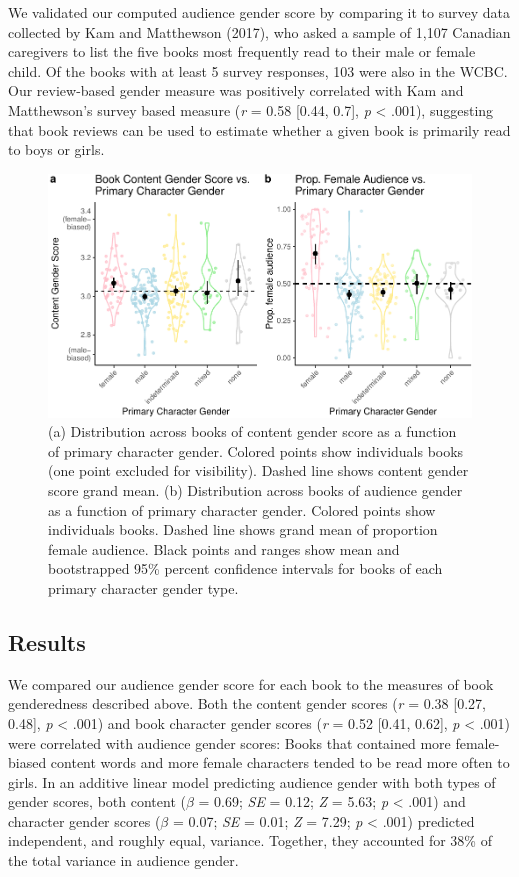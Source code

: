 \documentclass[english,,man,floatsintext]{apa6}
\begin{document}
We validated our computed audience gender score by comparing it to survey data collected by Kam and Matthewson (2017), who asked a sample of 1,107 Canadian caregivers to list the five books most frequently read to their male or female child. Of the books with at least 5 survey responses, 103 were also in the WCBC. Our review-based gender measure was positively correlated with Kam and Matthewson's survey based measure (\emph{r} = 0.58 {[}0.44, 0.7{]}, \emph{p} \textless{} .001), suggesting that book reviews can be used to estimate whether a given book is primarily read to boys or girls.

\begin{figure}[t!]
\includegraphics[width=\textwidth,]{kidbookgender_files/figure-latex/characterplots-1} \caption{(a) Distribution across books of content gender score as a function of primary character gender. Colored points show individuals books (one point excluded for visibility). Dashed line shows content gender score grand mean. (b) Distribution across books of audience gender as a function of primary character gender. Colored points show individuals books. Dashed line shows grand mean of proportion female audience. Black points and ranges show mean and bootstrapped 95\% percent confidence intervals for books of each primary character gender type.}\label{fig:characterplots}
\end{figure}

\hypertarget{results-1}{%
\subsection{Results}\label{results-1}}

We compared our audience gender score for each book to the measures of book genderedness described above. Both the content gender scores (\emph{r} = 0.38 {[}0.27, 0.48{]}, \emph{p} \textless{} .001) and book character gender scores (\emph{r} = 0.52 {[}0.41, 0.62{]}, \emph{p} \textless{} .001) were correlated with audience gender scores: Books that contained more female-biased content words and more female characters tended to be read more often to girls. In an additive linear model predicting audience gender with both types of gender scores, both content (\(\beta\) = 0.69; \emph{SE} = 0.12; \emph{Z} = 5.63; \emph{p} \textless{} .001) and character gender scores (\(\beta\) = 0.07; \emph{SE} = 0.01; \emph{Z} = 7.29; \emph{p} \textless{} .001) predicted independent, and roughly equal, variance. Together, they accounted for 38\% of the total variance in audience gender.
\end{document}
